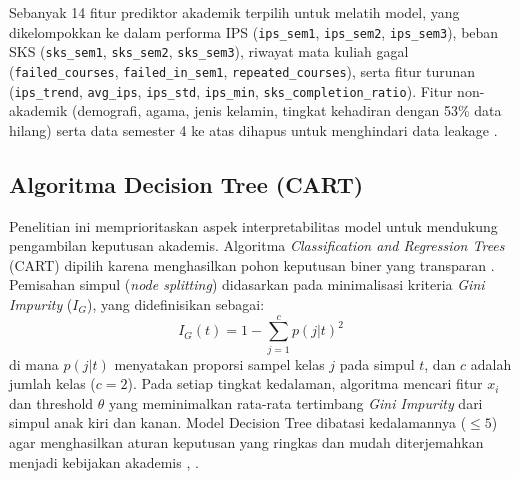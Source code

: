 \documentclass{ieeeaccess}
\begin{document}
Sebanyak 14 fitur prediktor akademik terpilih untuk melatih model, yang dikelompokkan ke dalam performa IPS (\texttt{ips\_sem1}, \texttt{ips\_sem2}, \texttt{ips\_sem3}), beban SKS (\texttt{sks\_sem1}, \texttt{sks\_sem2}, \texttt{sks\_sem3}), riwayat mata kuliah gagal (\texttt{failed\_courses}, \texttt{failed\_in\_sem1}, \texttt{repeated\_courses}), serta fitur turunan (\texttt{ips\_trend}, \texttt{avg\_ips}, \texttt{ips\_std}, \texttt{ips\_min}, \texttt{sks\_completion\_ratio}). Fitur non-akademik (demografi, agama, jenis kelamin, tingkat kehadiran dengan 53\% data hilang) serta data semester 4 ke atas dihapus untuk menghindari data leakage \cite{ref24}.

\subsection{Algoritma Decision Tree (CART)}
Penelitian ini memprioritaskan aspek interpretabilitas model untuk mendukung pengambilan keputusan akademis. Algoritma \emph{Classification and Regression Trees} (CART) dipilih karena menghasilkan pohon keputusan biner yang transparan \cite{ref12}. Pemisahan simpul (\emph{node splitting}) didasarkan pada minimalisasi kriteria \emph{Gini Impurity} ($I_G$), yang didefinisikan sebagai:
\begin{equation}
I_G(t) = 1 - \sum_{j=1}^{c} p(j|t)^2
\label{eq:gini}
\end{equation}
di mana $p(j|t)$ menyatakan proporsi sampel kelas $j$ pada simpul $t$, dan $c$ adalah jumlah kelas ($c=2$). Pada setiap tingkat kedalaman, algoritma mencari fitur $x_i$ dan threshold $\theta$ yang meminimalkan rata-rata tertimbang \emph{Gini Impurity} dari simpul anak kiri dan kanan. Model Decision Tree dibatasi kedalamannya ($\le 5$) agar menghasilkan aturan keputusan yang ringkas dan mudah diterjemahkan menjadi kebijakan akademis \cite{ref11}, \cite{ref13}.
\end{document}
